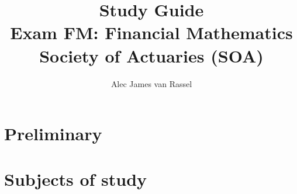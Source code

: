 \documentclass[12pt, titlepage, french]{report}
\title{
	Study Guide	\\
	\large Exam FM: Financial Mathematics\\
	Society of Actuaries (SOA)}
\date{}
\author{Alec James van Rassel}
\begin{document}
\maketitle

\tableofcontents

\clearpage

\part*{Preliminary}



\part*{Subjects of study}

\newpage



\newpage

	

\newpage



\newpage



\newpage



\newpage



\newpage



\newpage



\newpage
\end{document}

